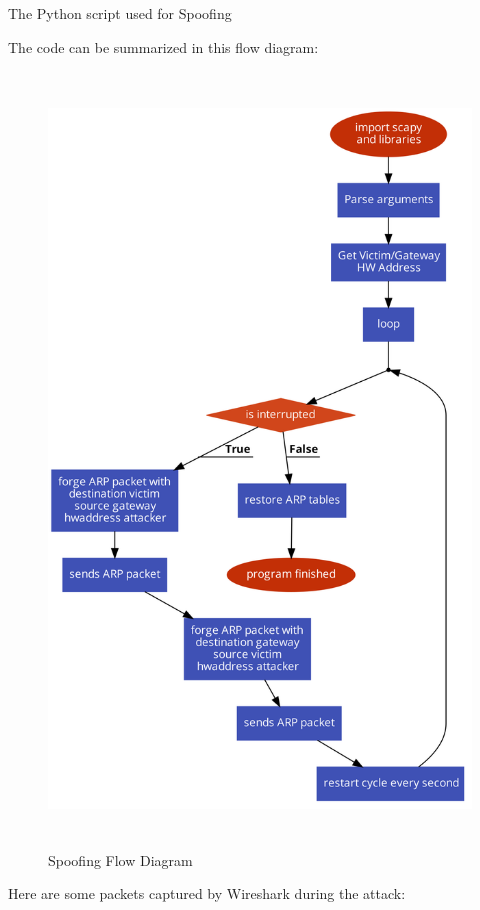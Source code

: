 \begin{center}
    The Python script used for  Spoofing
\end{center}


\newpage

The code can be summarized in this flow diagram:

\begin{figure}[h!]
 \centering
 \includegraphics[height=20.5cm]{img/arp_spoof_flow.png}
 \caption{ Spoofing Flow Diagram}
 \label{fig: Flow ARP}
\end{figure}


\newpage

Here are some packets captured by Wireshark\cite{wireshark} during the attack:

